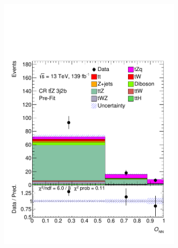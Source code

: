 \begin{figure}[!h]
\begin{subfigure}[b]{0.33\linewidth}
    \includegraphics[width=\textwidth]{ubonn-thesis/Chapters/Chapters_07/Figure/Data/CR_3j2b.pdf} 
  \end{subfigure}%
  \newline
  \begin{subfigure}[b]{0.33\linewidth}
    \centering

\end{subfigure}
\end{figure}
